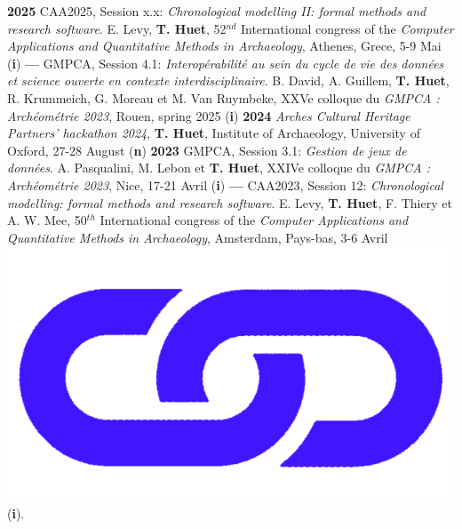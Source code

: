 \documentclass{article}
\begin{document}
\textbf{2025 }CAA2025, Session x.x: \textit{Chronological modelling II: formal methods and research software}. E. Levy, \textbf{T. Huet}, 52${}^{nd}$ International congress of the \textit{Computer Applications and Quantitative Methods in Archaeology}, Athenes, Grece, 5-9 Mai (\textbf{i})
\smallbreak
\textbf{--- }GMPCA, Session 4.1: \textit{Interopérabilité au sein du cycle de vie des données et science ouverte en contexte interdisciplinaire}. B. David, A. Guillem, \textbf{T. Huet}, R. Krummeich, G. Moreau et M. Van Ruymbeke, XXVe colloque du \textit{GMPCA : Archéométrie 2023}, Rouen, spring 2025 (\textbf{i})
\smallbreak
\textbf{2024 }\textit{Arches Cultural Heritage Partners' hackathon 2024}, \textbf{T. Huet}, Institute of Archaeology, University of Oxford, 27-28 August (\textbf{n})
\smallbreak
\textbf{2023 }GMPCA, Session 3.1: \textit{Gestion de jeux de données}. A. Pasqualini, M. Lebon et \textbf{T. Huet}, XXIVe colloque du \textit{GMPCA : Archéométrie 2023}, Nice, 17-21 Avril (\textbf{i})
\smallbreak
\textbf{--- }CAA2023, Session 12: \textit{Chronological modelling: formal methods and research software}. E. Levy, \textbf{T. Huet}, F. Thiery et A. W. Mee, 50${}^{th}$ International congress of the \textit{Computer Applications and Quantitative Methods in Archaeology}, Amsterdam, Pays-bas, 3-6 Avril \href{https://historical-time.github.io/caa23/s12/pres/#/title-slide}{\includegraphics[scale=0.015]{link_darkblue.png}} (\textbf{i}).
\smallbreak
\end{document}

